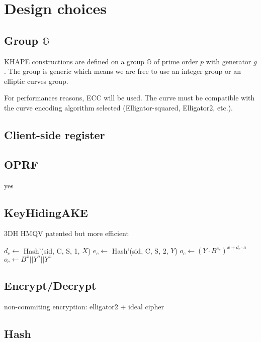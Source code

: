 \documentclass[../report.tex]{subfiles}
\begin{document}
\section{Design choices}

\subsection{Group $\mathbb{G}$}



KHAPE constructions are defined on a group $\mathbb{G}$ of prime order $p$ with generator $g$.
The group is generic which means we are free to use an integer group or an elliptic curves group.

For performances reasons, ECC will be used.
The curve must be compatible with the curve encoding algorithm selected (Elligator-squared, Elligator2, etc.).



\subsection{Client-side register}


\subsection{OPRF}
yes

\subsection{KeyHidingAKE}
3DH
HMQV patented but more efficient

\begin{algorithmic}
\State $d_c \gets$ Hash'(sid, C, S, 1, $X$)
\State $e_c \gets$ Hash'(sid, C, S, 2, $Y$)
\State $o_c \gets (Y \cdot B^{e_c})^{x+d_c \cdot a}$
\State
\State $o_c \gets B^x || Y^a || Y^x$
\end{algorithmic}


\subsection{Encrypt/Decrypt}
non-commiting encryption: elligator2 + ideal cipher



\subsection{Hash}
\end{document}
